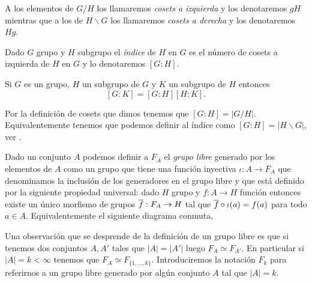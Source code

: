 \documentclass[tesis.tex]{subfiles}
\begin{document}
A los elementos de $G/H$ los llamaremos \emph{cosets a izquierda} y los denotaremos $gH$ mientras que a los de $H \backslash G$ los llamaremos \emph{cosets a derecha} y los denotaremos $Hg$.

\begin{deff}
	Dado $G$ grupo y $H$ subgrupo el \emph{índice} de $H$ en $G$ es el número de cosets a izquierda de $H$ en $G$ y lo denotaremos $[G:H]$.
\end{deff}


\begin{lema}\label{lema_ind_prod_inter}
	Si $G$ es un grupo, $H$ un subgrupo de $G$ y $K$ un subgrupo de $H$ entonces
	\[
	[G:K] = [G:H][H:K].
	\]
\end{lema}

Por la definición de cosets que dimos tenemos que $[G:H] = |G/H|$.
Equivalentemente tenemos que podemos definir al índice como $[G:H] = |H \backslash G|$, ver \cite{}.

\begin{deff}
	Dado un conjunto $A$ podemos definir a $F_{A}$ el \emph{grupo libre} generado por los elementos de $A$ como un grupo que tiene una función inyectiva $\iota: A \to F_{A}$ que denominamos la inclusión de los generadores en el grupo libre y que está definido por la siguiente propiedad universal: 
	dado $H$ grupo y $f:A \to H$ función entonces existe un único morfismo de grupos $\overline f: F_{A} \to H$ tal que $\overline f \circ \iota (a) = f(a)$ para todo $a \in A$.
	Equivalentemente el siguiente diagrama conmuta,
	\begin{center}
	\end{center}
	
\end{deff}

\begin{obs}
	Una observación que se desprende de la definición de un grupo libre es que si tenemos dos conjuntos $A, A'$ tales que $|A| = |A'|$ luego $F_{A} \simeq F_{A'}$.
En particular si $|A|=k < \infty$ tenemos que $F_{A} \simeq F_{ \{1, \dots, k \} }$.
Introduciremos la notación $F_{k}$ para referirnos a un grupo libre generado por algún conjunto $A$ tal que $|A| = k$.
\end{obs}
\end{document}

